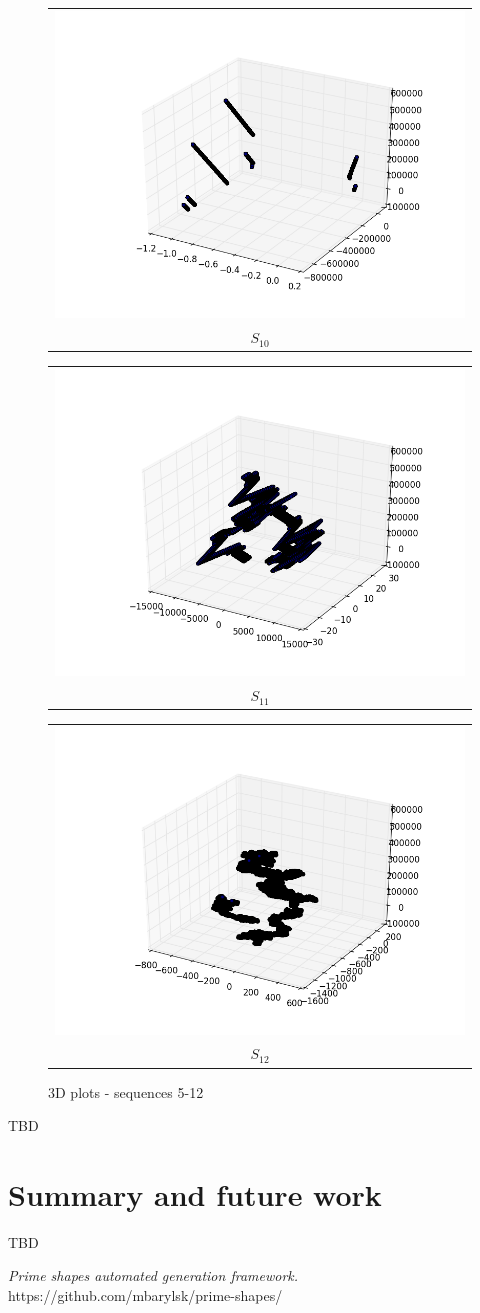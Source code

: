 \documentclass[10pt,twocolumn]{article}
\makeatletter
\newcommand{\subsubfloat}[2]{%
  \begin{tabular}{@{}c@{}}#1\\#2\end{tabular}%
}
\makeatother
\begin{document}
\begin{figure}
{\begin{minipage}{\columnwidth}
  \qquad
  \subsubfloat{\includegraphics[width=0.45\columnwidth]{f_shape_103d}}{$S_{10}$}
  \qquad
  \subsubfloat{\includegraphics[width=0.45\columnwidth]{f_shape_113d}}{$S_{11}$}
  \qquad
  \subsubfloat{\includegraphics[width=0.45\columnwidth]{f_shape_123d}}{$S_{12}$}

  \end{minipage}
}

\caption{3D plots - sequences 5-12}
\end{figure}

\twocolumn

TBD

\section{Summary and future work}

TBD

\begin{thebibliography}{9}

  \emph{Prime shapes automated generation framework.}
  https://github.com/mbarylsk/prime-shapes/

\end{thebibliography}
\end{document}
